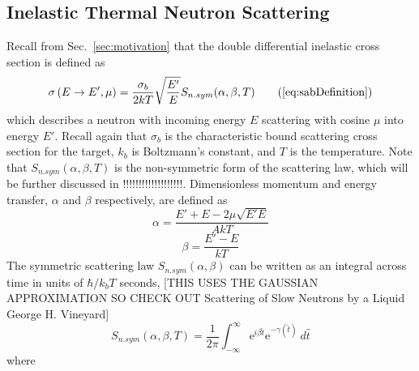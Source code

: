 \documentclass[../master.tex]{subfiles}
\begin{document}
		\subsection{Inelastic Thermal Neutron Scattering}
			Recall from Sec.~\ref{sec:motivation} that the double differential inelastic cross section is defined as 
			\begin{equation*}
				\sigma\left(E\rightarrow E',\mu\right)=\frac{\sigma_{b}}{2kT}\sqrt{\frac{E'}{E}}S_{n.sym}(\alpha,\beta,T)\tag{\ref{eq:sabDefinition}}
			\end{equation*}
			which describes a neutron with incoming energy $E$ scattering with cosine $\mu$ into energy $E'$. Recall again that $\sigma_b$ is the characteristic bound scattering cross section for the target, $k_b$ is Boltzmann's constant, and $T$ is the temperature. Note that $S_{n.sym}(\alpha,\beta,T)$ is the non-symmetric form of the scattering law, which will be further discussed in !!!!!!!!!!!!!!!!!!!. Dimensionless momentum and energy transfer, $\alpha$ and $\beta$ respectively, are defined as 
			\begin{equation}
				\alpha=\frac{E'+E-2\mu\sqrt{E'E}}{AkT}
			\end{equation}
			\begin{equation}
				\beta=\frac{E'-E}{kT}
			\end{equation}
			The symmetric scattering law $S_{n.sym}(\alpha,\beta)$ can be written as an integral across time in units of $\hbar/k_bT$ seconds, [THIS USES THE GAUSSIAN APPROXIMATION SO CHECK OUT Scattering of Slow Neutrons by a Liquid George H. Vineyard]
			\begin{equation}
				S_{n.sym}(\alpha,\beta,T)=\frac{1}{2\pi}\int_{-\infty}^{\infty}\mathrm{e}^{i\beta\hat{t}}\mathrm{e}^{-\gamma(\hat{t})}~d\hat{t}\label{eq:sabIntegralWithGamma}
			\end{equation}
			where 
\end{document}

